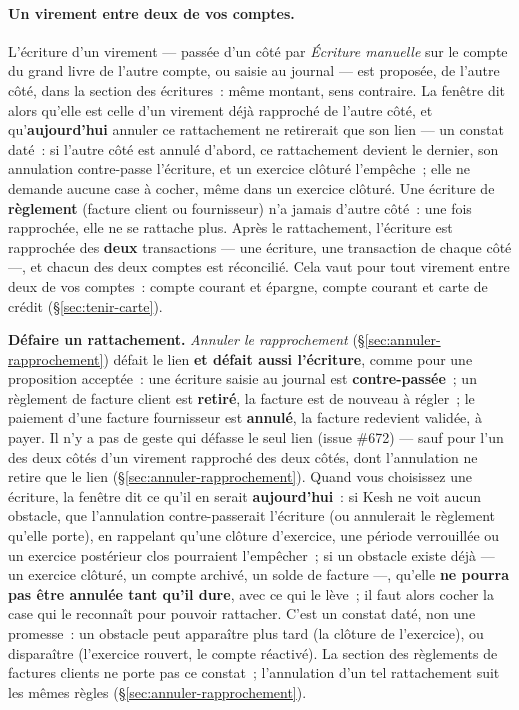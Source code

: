 \documentclass[a4paper,11pt,oneside]{article}
\begin{document}
\paragraph{Un virement entre deux de vos comptes.} L'écriture d'un virement --- passée d'un côté par \emph{Écriture manuelle} sur le compte du grand livre de l'autre compte, ou saisie au journal --- est proposée, de l'autre côté, dans la section des écritures~: même montant, sens contraire. La fenêtre dit alors qu'elle est celle d'un virement déjà rapproché de l'autre côté, et qu'\textbf{aujourd'hui} annuler ce rattachement ne retirerait que son lien --- un constat daté~: si l'autre côté est annulé d'abord, ce rattachement devient le dernier, son annulation contre-passe l'écriture, et un exercice clôturé l'empêche~; elle ne demande aucune case à cocher, même dans un exercice clôturé. Une écriture de \textbf{règlement} (facture client ou fournisseur) n'a jamais d'autre côté~: une fois rapprochée, elle ne se rattache plus. Après le rattachement, l'écriture est rapprochée des \textbf{deux} transactions --- une écriture, une transaction de chaque côté ---, et chacun des deux comptes est réconcilié. Cela vaut pour tout virement entre deux de vos comptes~: compte courant et épargne, compte courant et carte de crédit (\S\ref{sec:tenir-carte}).

\textbf{Défaire un rattachement.} \emph{Annuler le rapprochement} (\S\ref{sec:annuler-rapprochement}) défait le lien \textbf{et défait aussi l'écriture}, comme pour une proposition acceptée~: une écriture saisie au journal est \textbf{contre-passée}~; un règlement de facture client est \textbf{retiré}, la facture est de nouveau à régler~; le paiement d'une facture fournisseur est \textbf{annulé}, la facture redevient validée, à payer. Il n'y a pas de geste qui défasse le seul lien (issue \#672) --- sauf pour l'un des deux côtés d'un virement rapproché des deux côtés, dont l'annulation ne retire que le lien (\S\ref{sec:annuler-rapprochement}). Quand vous choisissez une écriture, la fenêtre dit ce qu'il en serait \textbf{aujourd'hui}~: si Kesh ne voit aucun obstacle, que l'annulation contre-passerait l'écriture (ou annulerait le règlement qu'elle porte), en rappelant qu'une clôture d'exercice, une période verrouillée ou un exercice postérieur clos pourraient l'empêcher~; si un obstacle existe déjà --- un exercice clôturé, un compte archivé, un solde de facture ---, qu'elle \textbf{ne pourra pas être annulée tant qu'il dure}, avec ce qui le lève~; il faut alors cocher la case qui le reconnaît pour pouvoir rattacher. C'est un constat daté, non une promesse~: un obstacle peut apparaître plus tard (la clôture de l'exercice), ou disparaître (l'exercice rouvert, le compte réactivé). La section des règlements de factures clients ne porte pas ce constat~; l'annulation d'un tel rattachement suit les mêmes règles (\S\ref{sec:annuler-rapprochement}).
\end{document}
